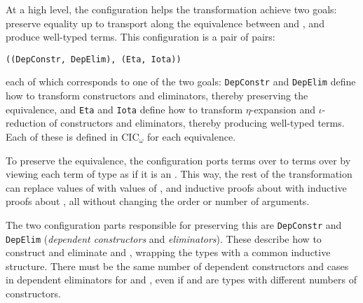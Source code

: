 At a high level, the configuration helps the transformation achieve two goals: preserve equality up to transport along the equivalence 
between \A and \B, and produce well-typed terms.
This configuration is a pair of pairs:

\begin{lstlisting}
((DepConstr, DepElim), (Eta, Iota))
\end{lstlisting}
each of which corresponds to one of the two goals:
\lstinline{DepConstr} and \lstinline{DepElim} define how to transform constructors and eliminators, thereby preserving the equivalence, and 
\lstinline{Eta} and \lstinline{Iota} define how to transform $\eta$-expansion and $\iota$-reduction of constructors and eliminators, thereby producing well-typed terms.
Each of these is defined in CIC$_{\omega}$ for each equivalence.


To preserve the equivalence, the configuration ports terms over \A to terms over \B by viewing each
term of type \B as if it is an \A.
This way, the rest of the transformation can replace values of \A with values of \B, and
inductive proofs about \A with inductive proofs about \B, %
all without changing the order or number of arguments.

The two configuration parts responsible for preserving this are \lstinline{DepConstr}
and \lstinline{DepElim} (\textit{dependent constructors} and \textit{eliminators}).
These describe how to construct and eliminate \A and \B, wrapping the types with a common inductive structure.
There must be the same number of dependent constructors and cases in dependent eliminators for \A and \B,
even if \A and \B are types with different numbers of constructors.


